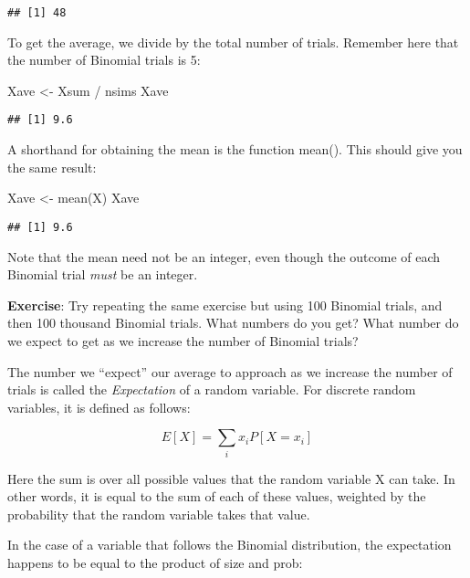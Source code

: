 \documentclass[
]{book}
\newenvironment{Shaded}{\begin{snugshade}}{\end{snugshade}}
\newcommand{\FunctionTok}[1]{\textcolor[rgb]{0.00,0.00,0.00}{#1}}
\newcommand{\NormalTok}[1]{#1}
\newcommand{\OtherTok}[1]{\textcolor[rgb]{0.56,0.35,0.01}{#1}}
\newcommand{\SpecialCharTok}[1]{\textcolor[rgb]{0.00,0.00,0.00}{#1}}
\begin{document}
\begin{verbatim}
## [1] 48
\end{verbatim}

To get the average, we divide by the total number of trials. Remember here that the number of Binomial trials is 5:

\begin{Shaded}
\begin{Highlighting}[]
\NormalTok{Xave }\OtherTok{\textless{}{-}}\NormalTok{ Xsum }\SpecialCharTok{/}\NormalTok{ nsims}
\NormalTok{Xave}
\end{Highlighting}
\end{Shaded}

\begin{verbatim}
## [1] 9.6
\end{verbatim}

A shorthand for obtaining the mean is the function mean(). This should give you the same result:

\begin{Shaded}
\begin{Highlighting}[]
\NormalTok{Xave }\OtherTok{\textless{}{-}} \FunctionTok{mean}\NormalTok{(X)}
\NormalTok{Xave}
\end{Highlighting}
\end{Shaded}

\begin{verbatim}
## [1] 9.6
\end{verbatim}

Note that the mean need not be an integer, even though the outcome of each Binomial trial \emph{must} be an integer.

\textbf{Exercise}: Try repeating the same exercise but using 100 Binomial trials, and then 100 thousand Binomial trials. What numbers do you get? What number do we expect to get as we increase the number of Binomial trials?

The number we ``expect'' our average to approach as we increase the number of trials is called the \emph{Expectation} of a random variable. For discrete random variables, it is defined as follows:

\[E[X] = \sum_{i}x_iP[X=x_i]\]

Here the sum is over all possible values that the random variable X can take. In other words, it is equal to the sum of each of these values, weighted by the probability that the random variable takes that value.

In the case of a variable that follows the Binomial distribution, the expectation happens to be equal to the product of size and prob:
\end{document}
